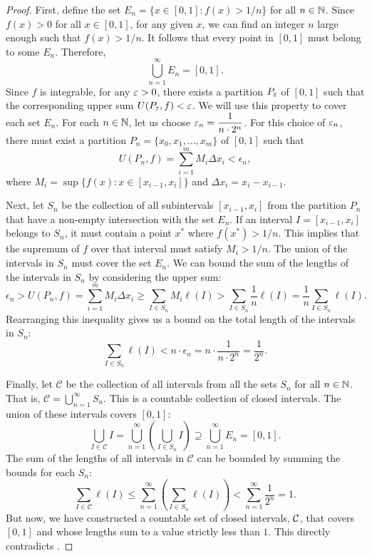 \begin{problem}
\begin{proof}
    First, define the set $E_{n} = \{ x \in [0, 1] : f(x) > 1/n \}$ for all $n \in \mathbb{N}$.
    Since $f(x) > 0$ for all $x \in [0, 1]$, for any given $x$, we can find an integer $n$ large enough such that $f(x) > 1/n$. 
    It follows that every point in $[0, 1]$ must belong to some $E_{n}$. Therefore, 
    \[
      \bigcup_{n=1}^{\infty} E_{n} = [0, 1].
    \]
    Since $f$ is integrable, for any $\varepsilon > 0$, there exists a partition $P_{\varepsilon}$ of $[0, 1]$ such that the 
    corresponding upper sum $U(P_{\varepsilon}, f) < \varepsilon$. We will use this property to cover each set $E_{n}$.
    For each $n \in \mathbb{N}$, let us choose $\varepsilon_{n} = \dfrac{1}{n \cdot 2^{n}}$.
    For this choice of $\varepsilon_{n}$, there must exist a partition $P_n = \{x_0, x_1, \ldots, x_m\}$ of $[0, 1]$ such that
    \[
      U(P_n, f) = \sum_{i=1}^m M_i \Delta x_i < \epsilon_n,
    \]
    where $M_i = \sup \{ f(x) : x \in [x_{i-1}, x_i] \}$ and $\Delta x_i = x_i - x_{i-1}$.
    
    Next, let $S_{n}$ be the collection of all subintervals $[x_{i-1}, x_i]$ from the partition $P_n$ that have a non-empty intersection
    with the set $E_{n}$. If an interval $I = [x_{i-1}, x_i]$ belongs to $S_{n}$, it must contain a point $x^{*}$ where $f(x^{*}) > 1/n$. 
    This implies that the supremum of $f$ over that interval must satisfy $M_i > 1/n$.
    The union of the intervals in $S_{n}$ must cover the set $E_{n}$.
    We can bound the sum of the lengths of the intervals in $S_{n}$ by considering the upper sum:
    \[
      \epsilon_n > U(P_n, f) = \sum_{i=1}^m M_i \Delta x_i \ge \sum_{I \in S_{n}} M_i \ell(I) > \sum_{I \in S_{n}} \frac{1}{n} \ell(I) = \frac{1}{n} \sum_{I \in S_{n}} \ell(I).
    \]
    Rearranging this inequality gives us a bound on the total length of the intervals in $S_{n}$:
    \[
      \sum_{I \in S_{n}} \ell(I) < n \cdot \epsilon_n = n \cdot \frac{1}{n \cdot 2^n} = \frac{1}{2^n}.
    \]

    Finally, let $\mathcal{C}$ be the collection of all intervals from all the sets $S_{n}$ for all $n \in \mathbb{N}$. 
    That is, $\mathcal{C} = \bigcup_{n=1}^\infty S_{n}$. This is a countable collection of closed
    intervals. The union of these intervals covers $[0, 1]$:
    \[
      \bigcup_{I \in \mathcal{C}} I = \bigcup_{n=1}^{\infty} \left( \bigcup_{I \in S_{n}} I \right) \supseteq \bigcup_{n=1}^{\infty} E_{n} = [0, 1].
    \]
    The sum of the lengths of all intervals in $\mathcal{C}$ can be bounded by summing the bounds for each $S_{n}$:
    \[
      \sum_{I \in \mathcal{C}} \ell(I) \le \sum_{n=1}^{\infty} \left( \sum_{I \in S_{n}} \ell(I) \right) < \sum_{n=1}^{\infty} \frac{1}{2^n} = 1.
    \]
    But now, we have constructed a countable set of closed intervals, $\mathcal{C}$, that covers $[0, 1]$ and whose lengths sum to a value strictly less than $1$. 
    This directly contradicts .

  \end{proof}

\end{problem}


